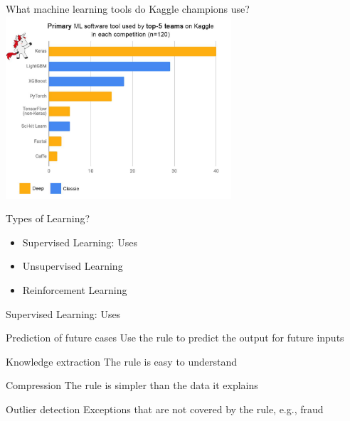 \documentclass{beamer}
\begin{document}
\begin{frame}{What machine learning tools do Kaggle champions use?}
 \includegraphics[height=6.8cm]{D3Pb_Q3UIAAuSWU.jpg}
\centering   
\end{frame}

\begin{frame}{Types of Learning?}
\begin{itemize}
    \item Supervised Learning: Uses
    \item Unsupervised Learning
    \item Reinforcement Learning
\end{itemize}
\end{frame}

\begin{frame}{Supervised Learning: Uses}
   \begin{block}{Prediction of future cases}
   Use the rule to predict the output for future inputs
   \end{block}
   \begin{block}{Knowledge extraction}
 The rule is easy to understand
   \end{block}
   \begin{block}{Compression}
  The rule is simpler than the data it explains
   \end{block}
   \begin{block}{Outlier detection}
   Exceptions that are not covered by the rule, e.g., fraud
   \end{block}
  
\end{frame}
\end{document}
